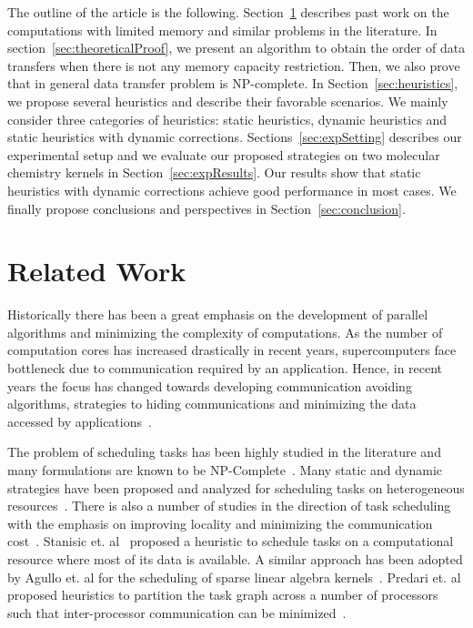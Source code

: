 \documentclass[runningheads]{llncs} %
\begin{document}
The outline of the article is the following. Section~\ref{sec:relatedWork} describes past work on the computations with limited memory and similar problems in the literature. In section~\ref{sec:theoreticalProof}, we present an algorithm to obtain the order of data transfers when there is not any memory capacity restriction. Then, we also prove that in general data transfer problem is NP-complete. In Section~\ref{sec:heuristics}, we propose several heuristics and describe their favorable scenarios. We mainly consider three categories of heuristics: static heuristics, dynamic heuristics and static heuristics with dynamic corrections. Sections~\ref{sec:expSetting} describes our experimental setup and we evaluate our proposed strategies on two molecular chemistry kernels in Section~\ref{sec:expResults}. Our results show that static heuristics with dynamic corrections achieve good performance in most cases. We finally propose conclusions and perspectives in Section~\ref{sec:conclusion}.

\section{Related Work}
\label{sec:relatedWork}


Historically there has been a great emphasis on the development of parallel algorithms and minimizing the complexity of computations. As the number of computation cores has increased drastically in recent years, supercomputers face bottleneck due to communication required by an application. Hence, in recent years the focus has changed towards developing communication avoiding algorithms, strategies to hiding communications and minimizing the data accessed by applications~\cite{yelick2016}. 


The problem of scheduling tasks has been highly studied in the literature and many formulations are known to be NP-Complete~\cite{GareyJohnson}. Many static and dynamic strategies have been proposed and analyzed for scheduling tasks on heterogeneous resources~\cite{heft-Topcuoglu,hipc16multiresource,ipdps16starpu}. There is also a number of studies in the direction of task scheduling with the emphasis on improving locality and minimizing the communication cost~\cite{starpu,heft-Topcuoglu}. Stanisic et. al~\cite{luka-dmdar} proposed a heuristic to schedule tasks on a computational resource where most of its data is available. A similar approach has been adopted by Agullo et. al for the scheduling of sparse linear algebra kernels~\cite{agullo_fmm}. Predari et. al proposed heuristics to partition the task graph across a number of processors such that inter-processor communication can be minimized~\cite{predari:tel-01518956}.
\end{document}
